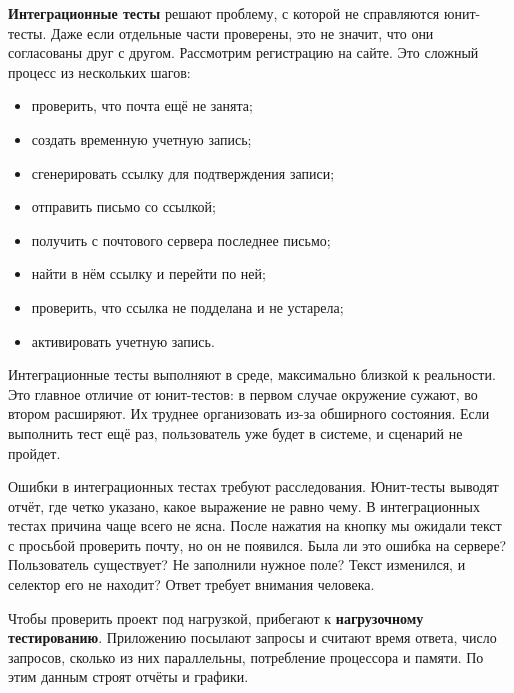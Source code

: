 
\textbf{Интеграционные тесты} решают проблему, с которой не справляются
юнит-тесты. Даже если отдельные части проверены, это не значит, что они
согласованы друг с другом. Рассмотрим регистрацию на сайте. Это сложный процесс
из нескольких шагов:

\begin{itemize}

\item
  проверить, что почта ещ\"{е} не занята;

\item
  создать временную учетную запись;

\item
  сгенерировать ссылку для подтверждения записи;

\item
  отправить письмо со ссылкой;

\item
  получить с почтового сервера последнее письмо;

\item
  найти в н\"{е}м ссылку и перейти по ней;

\item
  проверить, что ссылка не подделана и не устарела;

\item
  активировать учетную запись.

\end{itemize}

Интеграционные тесты выполняют в среде, максимально близкой к реальности. Это
главное отличие от юнит-тестов: в первом случае окружение сужают, во втором
расширяют. Их труднее организовать из-за обширного состояния. Если выполнить
тест ещ\"{е} раз, пользователь уже будет в системе, и сценарий не пройдет.

Ошибки в интеграционных тестах требуют расследования. Юнит-тесты выводят отч\"{е}т,
где четко указано, какое выражение не равно чему. В интеграционных тестах
причина чаще всего не ясна. После нажатия на кнопку мы ожидали текст с просьбой
проверить почту, но он не появился. Была ли это ошибка на сервере? Пользователь
существует? Не заполнили нужное поле? Текст изменился, и селектор его не
находит? Ответ требует внимания человека.


Чтобы проверить проект под нагрузкой, прибегают к \textbf{нагрузочному тестированию}.
Приложению посылают запросы и считают время ответа, число запросов, сколько
из них параллельны, потребление процессора и памяти. По этим данным строят
отч\"{е}ты и графики.

